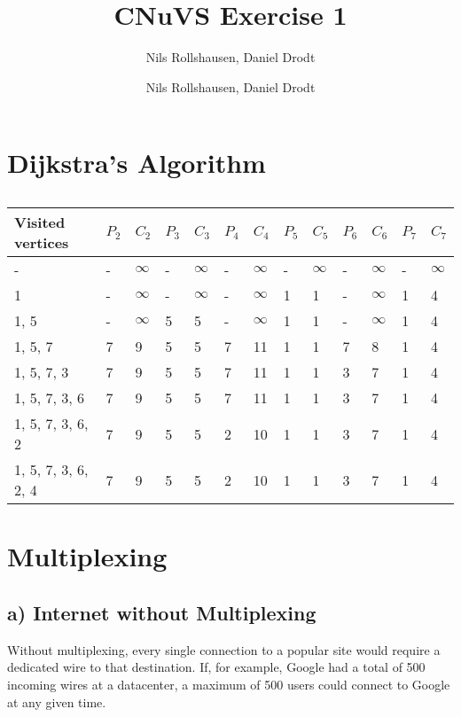 \documentclass[a4paper, 11 pt, article, accentcolor=tud7b]{tudreport}
\title{CNuVS Exercise 1}
\author{Nils Rollshausen, Daniel Drodt}
\subtitle{Nils Rollshausen, Daniel Drodt}
\begin{document}
	\maketitle
	\section{Dijkstra's Algorithm}
	
	\begin{longtable}[c]{l|ll|ll|ll|ll|ll|ll}
		\caption{}
		\label{Dijkstra}\\
		Visited vertices    & $P_2$ & $C_2$ & $P_3$ & $C_3$ & $P_4$ & $C_4$ & $P_5$ & $C_5$ & $P_6$ & $C_6$ & $P_7$ & $C_7$ \\ \hline
		\endfirsthead
		\endhead
		-                   & -    & $\infty$     & -    & $\infty$     & -    & $\infty$     & -    & $\infty$     & -    & $\infty$     & -    &  $\infty$    \\
		1                   & -    & $\infty$     & -    & $\infty$     & -    & $\infty$     & 1    & 1    & -    & $\infty$     &  1    & 4    \\
		1, 5                & -    & $\infty$     & 5    & 5    & -    & $\infty$     & 1    & 1    & -    & $\infty$     & 1    & 4    \\
		1, 5, 7             & 7    & 9    & 5    & 5    & 7    & 11   & 1    & 1    & 7    & 8    & 1    & 4    \\
		1, 5, 7, 3          & 7    & 9    & 5    & 5    & 7    & 11   & 1    & 1    & 3    & 7    & 1    & 4    \\
		1, 5, 7, 3, 6       & 7    & 9    & 5    & 5    & 7    & 11   & 1    & 1    & 3    & 7    & 1    & 4    \\
		1, 5, 7, 3, 6, 2    & 7    & 9    & 5    & 5    & 2    & 10   & 1    & 1    & 3    & 7    & 1    & 4    \\
		1, 5, 7, 3, 6, 2, 4 & 7    & 9    & 5    & 5    & 2    & 10   & 1    & 1    & 3    & 7    & 1    & 4   
	\end{longtable}
	
	\section{Multiplexing}
	\subsection*{a) Internet without Multiplexing}
	Without multiplexing, every single connection to a popular site would require a dedicated wire to that destination. If, for example, Google had a total of 500 incoming wires at a datacenter, a maximum of 500 users could connect to Google at any given time.
\end{document}
